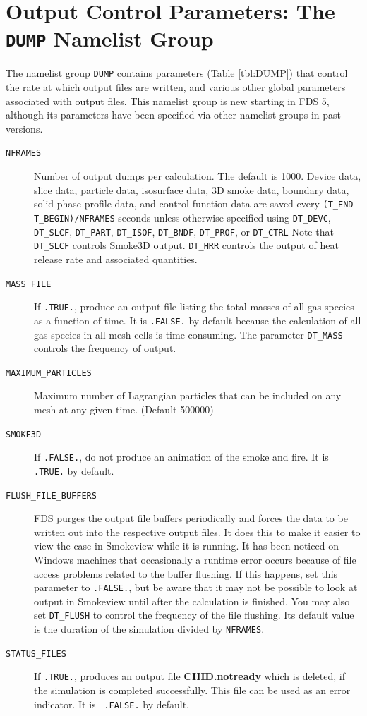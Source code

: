 \documentclass[11pt]{book}
\newcommand{\ct}{\tt\small}
\begin{document}
\section{Output Control Parameters: The \texorpdfstring{{\tt DUMP}}{DUMP} Namelist Group}
\label{info:DUMP}

The namelist group {\ct DUMP} contains parameters (Table \ref{tbl:DUMP}) that control the rate at which output files
are written, and various other global parameters associated with output files.
This namelist group is new starting in FDS 5, although its
parameters have been specified via other namelist groups in past versions.

\begin{description}
\item[{\ct NFRAMES}] Number of output dumps per calculation. The default is 1000.
Device data, slice data, particle data, isosurface data, 3D smoke data, boundary data, solid phase profile data, and
control function data are saved every {\ct (T\_END-T\_BEGIN)/NFRAMES} seconds unless otherwise specified
using {\ct DT\_DEVC}, {\ct DT\_SLCF}, {\ct DT\_PART}, {\ct DT\_ISOF}, {\ct DT\_BNDF}, {\ct DT\_PROF},
or {\ct DT\_CTRL} Note that {\ct DT\_SLCF} controls Smoke3D output. {\ct DT\_HRR} controls the
output of heat release rate and associated quantities.
\item[{\ct MASS\_FILE}] If {\ct .TRUE.}, produce an output file listing the total masses of all gas species as a function of time.
It is {\ct .FALSE.} by default because the calculation
of all gas species in all mesh cells is time-consuming. The parameter {\ct DT\_MASS} controls the frequency of output.
\item[{\ct MAXIMUM\_PARTICLES}] Maximum number of Lagrangian particles that can be included on any
mesh at any given time. (Default 500000)
\item[{\ct SMOKE3D}] If {\ct .FALSE.}, do not produce an animation of the smoke and fire. It is {\ct .TRUE.} by default.
\item[{\ct FLUSH\_FILE\_BUFFERS}] FDS
purges the output file buffers periodically and forces the data to be written out
into the respective output files. It does this to make it easier to view the case in Smokeview while it is running.
It has been noticed on Windows
machines that occasionally a runtime error occurs because of file
access problems related to the buffer flushing. If this happens, set
this parameter to {\ct .FALSE.}, but be aware that it may not be
possible to look at output in Smokeview until after the calculation is
finished. You may also set {\ct DT\_FLUSH} to control the frequency of the file flushing. Its default value is the duration of
the simulation divided by {\ct NFRAMES}.
\item[{\ct STATUS\_FILES}] If {\ct .TRUE.}, produces an output file
{\bf CHID.notready} which is deleted, if the simulation is completed
successfully. This file can be used as an error indicator. It is {\ct
.FALSE.} by default.
\end{description}
\end{document}

